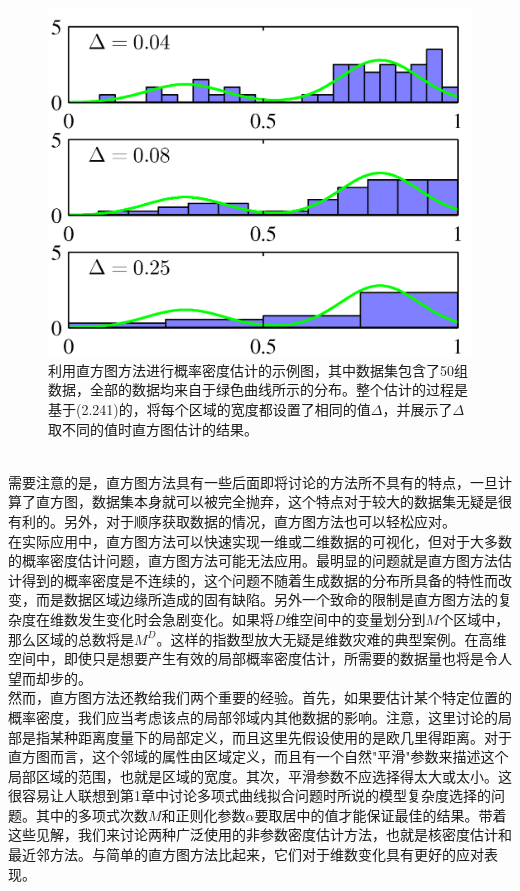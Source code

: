 \documentclass[b5paper]{book}
\numberwithin{equation}{chapter}
\begin{document}
{\begin{figure}[ht]
		\includegraphics[scale=0.8]{Images/2-24.png}
		\caption{利用直方图方法进行概率密度估计的示例图，其中数据集包含了50组数据，全部的数据均来自于绿色曲线所示的分布。整个估计的过程是基于(2.241)的，将每个区域的宽度都设置了相同的值$\Delta$，并展示了$\Delta$取不同的值时直方图估计的结果。}
		\label{fig:2-24}
	\end{figure}
	\\
	\indent 需要注意的是，直方图方法具有一些后面即将讨论的方法所不具有的特点，一旦计算了直方图，数据集本身就可以被完全抛弃，这个特点对于较大的数据集无疑是很有利的。另外，对于顺序获取数据的情况，直方图方法也可以轻松应对。\\
	\indent 在实际应用中，直方图方法可以快速实现一维或二维数据的可视化，但对于大多数的概率密度估计问题，直方图方法可能无法应用。最明显的问题就是直方图方法估计得到的概率密度是不连续的，这个问题不随着生成数据的分布所具备的特性而改变，而是数据区域边缘所造成的固有缺陷。另外一个致命的限制是直方图方法的复杂度在维数发生变化时会急剧变化。如果将$D$维空间中的变量划分到$M$个区域中，那么区域的总数将是$M^D$。这样的指数型放大无疑是维数灾难的典型案例。在高维空间中，即使只是想要产生有效的局部概率密度估计，所需要的数据量也将是令人望而却步的。\\
	\indent 然而，直方图方法还教给我们两个重要的经验。首先，如果要估计某个特定位置的概率密度，我们应当考虑该点的局部邻域内其他数据的影响。注意，这里讨论的局部是指某种距离度量下的局部定义，而且这里先假设使用的是欧几里得距离。对于直方图而言，这个邻域的属性由区域定义，而且有一个自然"平滑"参数来描述这个局部区域的范围，也就是区域的宽度。其次，平滑参数不应选择得太大或太小。这很容易让人联想到第1章中讨论多项式曲线拟合问题时所说的模型复杂度选择的问题。其中的多项式次数$M$和正则化参数$\alpha$要取居中的值才能保证最佳的结果。带着这些见解，我们来讨论两种广泛使用的非参数密度估计方法，也就是核密度估计和最近邻方法。与简单的直方图方法比起来，它们对于维数变化具有更好的应对表现。
	}
\end{document}
